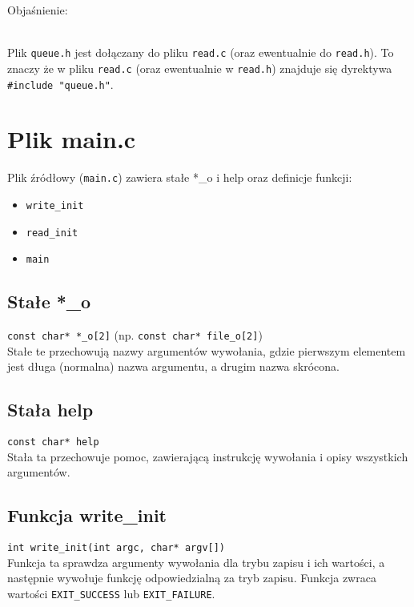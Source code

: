 \documentclass[11pt,a4paper]{report}
\begin{document}
    Objaśnienie:
    \\
    \\
    \begin{center}
    \end{center}
    Plik \verb|queue.h| jest dołączany do pliku \verb|read.c| (oraz ewentualnie do \verb|read.h|). To znaczy że w pliku \verb|read.c| (oraz ewentualnie w \verb|read.h|) znajduje się dyrektywa \verb|#include "queue.h"|.

    \newpage
    \section{Plik main.c}
    Plik źródłowy (\verb|main.c|) zawiera stałe *\_o i help oraz definicje funkcji:
    \begin{itemize}
        \item \verb|write_init|
        \item \verb|read_init|
        \item \verb|main|
    \end{itemize}
    \subsection{Stałe *\_o}
    \verb|const char* *_o[2]| (np. \verb|const char* file_o[2]|)\\
    Stałe te przechowują nazwy argumentów wywołania, gdzie pierwszym elementem jest długa (normalna) nazwa argumentu, a drugim nazwa skrócona.\\
    \subsection{Stała help}
    \verb|const char* help|\\
    Stała ta przechowuje pomoc, zawierającą instrukcję wywołania i opisy wszystkich argumentów.\\
    \subsection{Funkcja write\_init}
    \verb|int write_init(int argc, char* argv[])|\\
    Funkcja ta sprawdza argumenty wywołania dla trybu zapisu i ich wartości, a następnie wywołuje funkcję odpowiedzialną za tryb zapisu. Funkcja zwraca wartości \verb|EXIT_SUCCESS| lub \verb|EXIT_FAILURE|.\\
\end{document}
